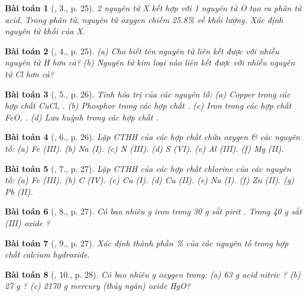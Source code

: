 \documentclass{article}
\newtheorem{baitoan}{Bài toán}
\begin{document}
\begin{baitoan}[\cite{An_Hoa_Hoc_nang_cao_8_9}, 3., p. 25]
	2 nguyên tử X kết hợp với 1 nguyên tử {\rm O} tạo ra phân tử acid. Trong phân tử, nguyên tử oxygen chiếm {\rm25.8\%} về khối lượng. Xác định nguyên tử khối của X.
\end{baitoan}

\begin{baitoan}[\cite{An_Hoa_Hoc_nang_cao_8_9}, 4., p. 25]
	(a) Cho biết tên nguyên tử liên kết được với nhiều nguyên tử {\rm H} hơn cả? (b) Nguyên tử kim loại nào liên kết được với nhiều nguyên tử {\rm Cl} hơn cả?
\end{baitoan}

\begin{baitoan}[\cite{An_Hoa_Hoc_nang_cao_8_9}, 5., p. 26]
	Tính hóa trị của các nguyên tố: (a) Copper trong các hợp chất {\rm CuCl, }. (b) Phosphor trong các hợp chất {\rm{}}. (c) Iron trong các hợp chất {\rm FeO, }. (d) Lưu huỳnh trong các hợp chất {\rm{}}.
\end{baitoan}

\begin{baitoan}[\cite{An_Hoa_Hoc_nang_cao_8_9}, 6., p. 26]
	Lập {\rm CTHH} của các hợp chất chứa oxygen \& các nguyên tố: (a) {\rm Fe (III)}. (b) {\rm Na (I)}. (c) {\rm N (III)}. (d) {\rm S (VI)}. (e) {\rm Al (III)}. (f) {\rm Mg (II)}.
\end{baitoan}

\begin{baitoan}[\cite{An_Hoa_Hoc_nang_cao_8_9}, 7., p. 27]
	Lập {\rm CTHH} của các hợp chất chlorine của các nguyên tố: (a) {\rm Fe (III)}. (b) {\rm C (IV)}. (c) {\rm Cu (I)}. (d) {\rm Cu (II)}. (e) {\rm Na (I)}. (f) {\rm Zn (II)}. (g) {\rm Pb (II)}.
\end{baitoan}

\begin{baitoan}[\cite{An_Hoa_Hoc_nang_cao_8_9}, 8., p. 27]
	Có bao nhiêu {\rm g} iron trong {\rm30 g} sắt pirit {\rm{}}. Trong {\rm40 g} sắt (III) oxide {\rm{}}?
\end{baitoan}

\begin{baitoan}[\cite{An_Hoa_Hoc_nang_cao_8_9}, 9., p. 27]
	Xác định thành phần \% của các nguyên tố trong hợp chất calcium hydroxide.
\end{baitoan}

\begin{baitoan}[\cite{An_Hoa_Hoc_nang_cao_8_9}, 10., p. 28]
	Có bao nhiêu {\rm g} oxygen trong: (a) {\rm63 g} acid nitric {\rm{}}? (b) {\rm27 g} {\rm{}}? (c) {\rm2170 g} mercury (thủy ngân) oxide {\rm HgO}?
\end{baitoan}
\end{document}
